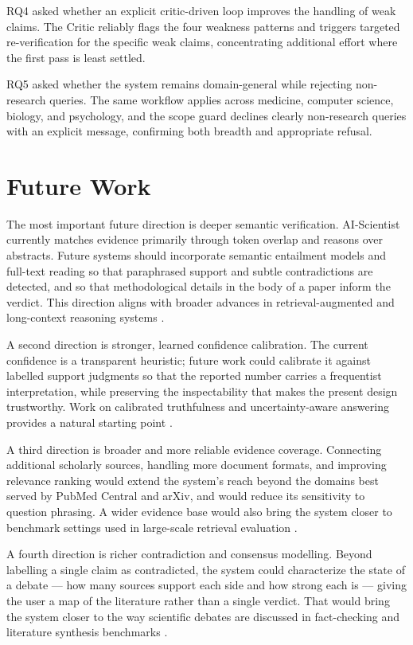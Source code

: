 RQ4 asked whether an explicit critic-driven loop improves the handling of weak claims. The Critic reliably flags the
four weakness patterns and triggers targeted re-verification for the specific weak claims, concentrating additional
effort where the first pass is least settled.

RQ5 asked whether the system remains domain-general while rejecting non-research queries. The same workflow applies
across medicine, computer science, biology, and psychology, and the scope guard declines clearly non-research
queries with an explicit message, confirming both breadth and appropriate refusal.

\section{Future Work }

The most important future direction is deeper semantic verification. AI-Scientist currently matches evidence
primarily through token overlap and reasons over abstracts. Future systems should incorporate semantic entailment
models and full-text reading so that paraphrased support and subtle contradictions are detected, and so that
methodological details in the body of a paper inform the verdict. This direction aligns with broader advances in
retrieval-augmented and long-context reasoning systems \cite{karpukhin2020dpr,khattab2020colbert,guu2020realm}.

A second direction is stronger, learned confidence calibration. The current confidence is a transparent heuristic;
future work could calibrate it against labelled support judgments so that the reported number carries a frequentist
interpretation, while preserving the inspectability that makes the present design trustworthy. Work on calibrated
truthfulness and uncertainty-aware answering provides a natural starting point \cite{kadavath2022language,lin2021truthfulqa}.

A third direction is broader and more reliable evidence coverage. Connecting additional scholarly sources, handling
more document formats, and improving relevance ranking would extend the system's reach beyond the domains best
served by PubMed Central and arXiv, and would reduce its sensitivity to question phrasing.
A wider evidence base would also bring the system closer to benchmark settings used in large-scale retrieval
evaluation \cite{petroni2020kilt,thakur2021beir}.

A fourth direction is richer contradiction and consensus modelling. Beyond labelling a single claim as contradicted,
the system could characterize the state of a debate --- how many sources support each side and how strong each is
--- giving the user a map of the literature rather than a single verdict.
That would bring the system closer to the way scientific debates are discussed in fact-checking and literature
synthesis benchmarks \cite{thorne2018fever,wadden2020scifact,min2023factscore}.

